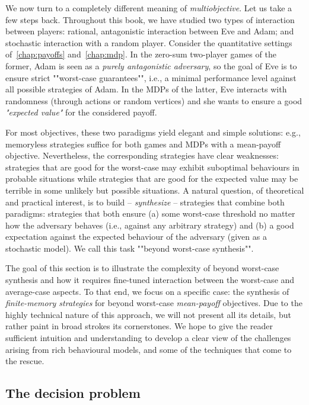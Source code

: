 We now turn to a completely different meaning of \textit{multiobjective}. Let us take a few steps back. Throughout this book, we have studied two types of interaction between players: rational, antagonistic interaction between Eve and Adam; and stochastic interaction with a random player. Consider the quantitative settings of~\cref{chap:payoffs} and~\cref{chap:mdp}. In the zero-sum two-player games of the former, Adam is seen as a \textit{purely antagonistic adversary}, so the goal of Eve is to ensure strict ""worst-case guarantees"", i.e., a minimal performance level against all possible strategies of Adam. In the MDPs of the latter, Eve interacts with randomness (through actions or random vertices) and she wants to ensure a good \textit{"expected value"} for the considered payoff.

For most objectives, these two paradigms yield elegant and simple solutions: e.g., memoryless strategies suffice for both games and MDPs with a mean-payoff objective. Nevertheless, the corresponding strategies have clear weaknesses: strategies that are good for the worst-case may exhibit suboptimal behaviours in probable situations while strategies that are good for the expected value may be terrible in some unlikely but possible situations. A natural question, of theoretical and practical interest, is to build -- \textit{synthesize} -- strategies that combine both paradigms: strategies that both ensure (a) some worst-case threshold no matter how the adversary behaves (i.e., against any arbitrary strategy) and (b) a good expectation against the expected behaviour of the adversary (given as a stochastic model). We call this task ""beyond worst-case synthesis"".

The goal of this section is to illustrate the complexity of beyond worst-case synthesis and how it requires fine-tuned interaction between the worst-case and average-case aspects. To that end, we focus on a specific case: the synthesis of \textit{finite-memory strategies} for beyond worst-case \textit{mean-payoff} objectives. Due to the highly technical nature of this approach, we will not present all its details, but rather paint in broad strokes its cornerstones. We hope to give the reader sufficient intuition and understanding to develop a clear view of the challenges arising from rich behavioural models, and some of the techniques that come to the rescue. 

\subsection{The decision problem}

